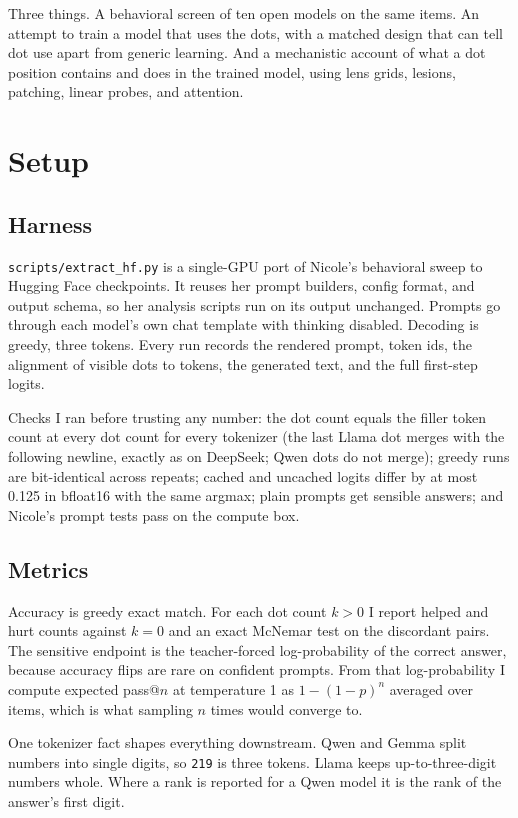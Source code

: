 \documentclass[11pt]{article}
\newcommand{\ttt}[1]{\texttt{\small #1}}
\begin{document}
Three things. A behavioral screen of ten open models on the same items. An attempt to train a model that uses the dots, with a matched design that can tell dot use apart from generic learning. And a mechanistic account of what a dot position contains and does in the trained model, using lens grids, lesions, patching, linear probes, and attention.

\section{Setup}

\subsection{Harness}

\ttt{scripts/extract\_hf.py} is a single-GPU port of Nicole's behavioral sweep to Hugging Face checkpoints. It reuses her prompt builders, config format, and output schema, so her analysis scripts run on its output unchanged. Prompts go through each model's own chat template with thinking disabled. Decoding is greedy, three tokens. Every run records the rendered prompt, token ids, the alignment of visible dots to tokens, the generated text, and the full first-step logits.

Checks I ran before trusting any number: the dot count equals the filler token count at every dot count for every tokenizer (the last Llama dot merges with the following newline, exactly as on DeepSeek; Qwen dots do not merge); greedy runs are bit-identical across repeats; cached and uncached logits differ by at most 0.125 in bfloat16 with the same argmax; plain prompts get sensible answers; and Nicole's prompt tests pass on the compute box.

\subsection{Metrics}

Accuracy is greedy exact match. For each dot count $k > 0$ I report helped and hurt counts against $k = 0$ and an exact McNemar test on the discordant pairs. The sensitive endpoint is the teacher-forced log-probability of the correct answer, because accuracy flips are rare on confident prompts. From that log-probability I compute expected pass@$n$ at temperature 1 as $1 - (1-p)^n$ averaged over items, which is what sampling $n$ times would converge to.

One tokenizer fact shapes everything downstream. Qwen and Gemma split numbers into single digits, so \ttt{219} is three tokens. Llama keeps up-to-three-digit numbers whole. Where a rank is reported for a Qwen model it is the rank of the answer's first digit.
\end{document}

